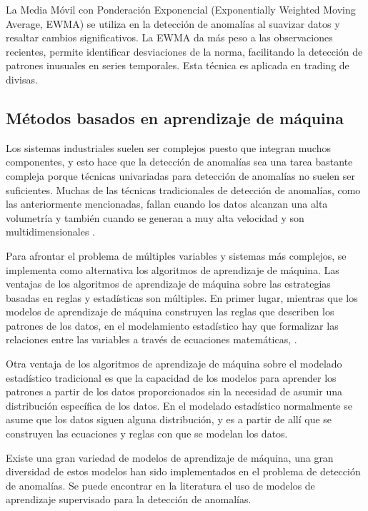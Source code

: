 \documentclass[11pt,a4paper,spanish]{book}
\numberwithin{equation}{chapter}
\numberwithin{figure}{chapter}
\begin{document}
La Media Móvil con Ponderación Exponencial (Exponentially Weighted Moving Average, EWMA) 
\cite{fan1996ewma} se utiliza en la detección de anomalías al suavizar datos y resaltar 
cambios significativos. La EWMA da más peso a las observaciones recientes, permite 
identificar desviaciones de la norma, facilitando la detección de patrones inusuales en 
series temporales. Esta técnica es aplicada en trading de divisas. 


\subsection{Métodos basados en aprendizaje de máquina}


Los sistemas industriales suelen ser complejos puesto que integran muchos componentes, y 
esto hace que la detección de anomalías sea una tarea bastante compleja porque técnicas 
univariadas para detección de anomalías no suelen ser suficientes. 
Muchas de las técnicas tradicionales de detección de anomalías, como las anteriormente 
mencionadas, fallan cuando los datos alcanzan una alta volumetría y también cuando se 
generan a muy alta velocidad y son multidimensionales \cite{thudumu2020survey}.


Para afrontar el problema de múltiples variables y sistemas más complejos, se implementa
como alternativa los algoritmos de aprendizaje de máquina. Las ventajas de los algoritmos
de aprendizaje de máquina sobre las estrategias basadas en reglas y estadísticas son múltiples.
En primer lugar, mientras que los modelos de aprendizaje de máquina construyen las reglas
que describen los patrones de los datos, en el modelamiento estadístico hay que formalizar
las relaciones entre las variables a través de ecuaciones matemáticas, \cite{ij2018statvsml}. 


Otra ventaja de los algoritmos de aprendizaje de máquina sobre el modelado estadístico
tradicional es que la capacidad de los modelos para aprender los patrones a partir de 
los datos proporcionados sin la necesidad de asumir una distribución específica de los datos.
En el modelado estadístico normalmente se asume que los datos siguen alguna distribución,
y es a partir de allí que se construyen las ecuaciones y reglas con que se modelan los datos. 


Existe una gran variedad de modelos de aprendizaje de máquina, una gran diversidad de 
estos modelos han sido implementados en el problema de detección de anomalías.
Se puede encontrar en la literatura el uso de modelos de aprendizaje supervisado para la
detección de anomalías. 
\end{document}
